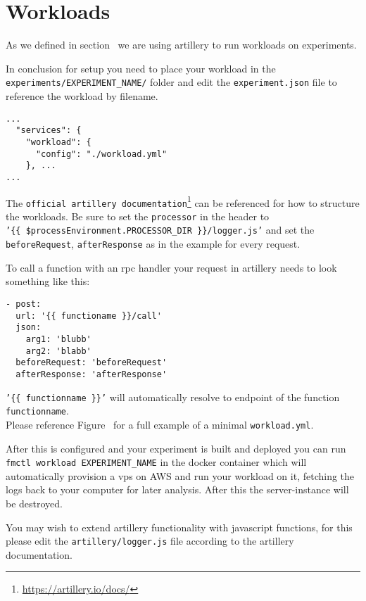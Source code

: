 \documentclass[../main.tex]{subfiles}
\begin{document}
\section{Workloads}\label{sec:WorkloadsUsage}

As we defined in section~ we are using artillery to run workloads on experiments. 

In conclusion for setup you need to place your workload in the \\
\texttt{experiments/EXPERIMENT\_NAME/} 
folder and edit the \texttt{experiment.json} file to reference the workload by filename.

\begin{tcolorbox}[titleDetachedStyle, title=\texttt{experiment.json}]
\begin{verbatim}
...
  "services": {
    "workload": {
      "config": "./workload.yml"
    }, ...
...
\end{verbatim}
\end{tcolorbox}

The \texttt{official artillery documentation}\footnote{\url{https://artillery.io/docs/}} can be referenced for how to structure the workloads. Be sure to set the \texttt{processor} in the header to \\\texttt{'\{\{ \$processEnvironment.PROCESSOR\_DIR \}\}/logger.js'} and set the \texttt{beforeRequest}, \texttt{afterResponse} as in the example  for every request. 



To call a function with an rpc handler your request in artillery needs to look something like this:

\begin{tcolorbox}[titleDetachedStyle, title=\texttt{workload.yml}]
\begin{verbatim}
- post:
  url: '{{ functioname }}/call'
  json:
    arg1: 'blubb' 
    arg2: 'blabb'
  beforeRequest: 'beforeRequest'
  afterResponse: 'afterResponse'
\end{verbatim}
\end{tcolorbox}

\texttt{'\{\{ functionname \}\}'} will automatically resolve to endpoint of the function \texttt{functionname}. \\
Please reference Figure~ for a full example of a minimal \texttt{workload.yml}.

After this is configured and your experiment is built and deployed you can run \texttt{fmctl workload EXPERIMENT\_NAME} in the docker container which will automatically provision a vps on AWS and run your workload on it, fetching the logs back to your computer for later analysis. After this the server-instance will be destroyed.

You may wish to extend artillery functionality with javascript functions, for this please edit the \texttt{artillery/logger.js} file according to the artillery documentation.
\end{document}
